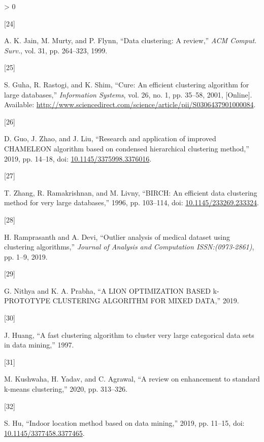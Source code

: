 \documentclass[
]{article}
\newlength{\cslhangindent}
\newlength{\csllabelwidth}
\newenvironment{CSLReferences}[3] %
 {%
  \setlength{\parindent}{0pt}
  \ifodd #1 \everypar{\setlength{\hangindent}{\cslhangindent}}\ignorespaces\fi
  \ifnum #2 > 0
  \setlength{\parskip}{#2\baselineskip}
  \fi
 }%
 {}
\newcommand{\CSLLeftMargin}[1]{\parbox[t]{\csllabelwidth}{#1}}
\newcommand{\CSLRightInline}[1]{\parbox[t]{\linewidth - \csllabelwidth}{#1}}
\begin{document}
\begin{CSLReferences}{0}{0}
\leavevmode\hypertarget{ref-Rjainmurtyflynn1999}{}%
\CSLLeftMargin{{[}24{]} }
\CSLRightInline{A. K. Jain, M. Murty, and P. Flynn, {``Data clustering:
A review,''} \emph{ACM Comput. Surv.}, vol. 31, pp. 264--323, 1999.}

\leavevmode\hypertarget{ref-Rguharastogishim2001}{}%
\CSLLeftMargin{{[}25{]} }
\CSLRightInline{S. Guha, R. Rastogi, and K. Shim, {``Cure: An efficient
clustering algorithm for large databases,''} \emph{Information Systems},
vol. 26, no. 1, pp. 35--58, 2001, {[}Online{]}. Available:
\url{http://www.sciencedirect.com/science/article/pii/S0306437901000084}.}

\leavevmode\hypertarget{ref-Rdongweijingjingjici2019}{}%
\CSLLeftMargin{{[}26{]} }
\CSLRightInline{D. Guo, J. Zhao, and J. Liu, {``Research and application
of improved CHAMELEON algorithm based on condensed hierarchical
clustering method,''} 2019, pp. 14--18, doi:
\href{https://doi.org/10.1145/3375998.3376016}{10.1145/3375998.3376016}.}

\leavevmode\hypertarget{ref-Rtianraghumiron1996}{}%
\CSLLeftMargin{{[}27{]} }
\CSLRightInline{T. Zhang, R. Ramakrishnan, and M. Livny, {``BIRCH: An
efficient data clustering method for very large databases,''} 1996, pp.
103--114, doi:
\href{https://doi.org/10.1145/233269.233324}{10.1145/233269.233324}.}

\leavevmode\hypertarget{ref-Rha2019}{}%
\CSLLeftMargin{{[}28{]} }
\CSLRightInline{H. Ramprasanth and A. Devi, {``Outlier analysis of
medical dataset using clustering algorithms,''} \emph{Journal of
Analysis and Computation ISSN:(0973-2861)}, pp. 1--9, 2019.}

\leavevmode\hypertarget{ref-Rnithyaprabha2019}{}%
\CSLLeftMargin{{[}29{]} }
\CSLRightInline{G. Nithya and K. A. Prabha, {``A LION OPTIMIZATION BASED
k-PROTOTYPE CLUSTERING ALGORITHM FOR MIXED DATA,''} 2019.}

\leavevmode\hypertarget{ref-Rhuang1997}{}%
\CSLLeftMargin{{[}30{]} }
\CSLRightInline{J. Huang, {``A fast clustering algorithm to cluster very
large categorical data sets in data mining,''} 1997.}

\leavevmode\hypertarget{ref-Rmohithimanshuchetan2020}{}%
\CSLLeftMargin{{[}31{]} }
\CSLRightInline{M. Kushwaha, H. Yadav, and C. Agrawal, {``A review on
enhancement to standard k-means clustering,''} 2020, pp. 313--326.}

\leavevmode\hypertarget{ref-Rshan2019}{}%
\CSLLeftMargin{{[}32{]} }
\CSLRightInline{S. Hu, {``Indoor location method based on data
mining,''} 2019, pp. 11--15, doi:
\href{https://doi.org/10.1145/3377458.3377465}{10.1145/3377458.3377465}.}


\end{CSLReferences}
\end{document}
